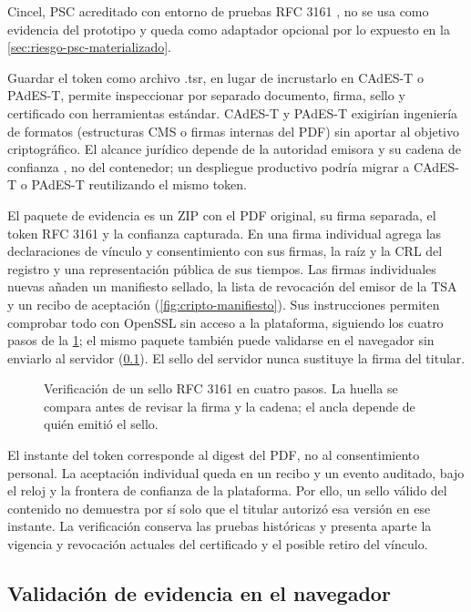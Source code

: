 Cincel, PSC acreditado con entorno de pruebas RFC 3161 \cite{cincel2024}, no se usa como evidencia del prototipo y queda como adaptador opcional por lo expuesto en la \cref{sec:riesgo-psc-materializado}.

Guardar el token como archivo .tsr, en lugar de incrustarlo en CAdES-T o PAdES-T, permite inspeccionar por separado documento, firma, sello y certificado con herramientas estándar. CAdES-T y PAdES-T exigirían ingeniería de formatos (estructuras CMS o firmas internas del PDF) sin aportar al objetivo criptográfico. El alcance jurídico depende de la autoridad emisora y su cadena de confianza \cite{nom151_2016}, no del contenedor; un despliegue productivo podría migrar a CAdES-T o PAdES-T reutilizando el mismo token.

El paquete de evidencia es un ZIP con el PDF original, su firma separada, el token RFC 3161 y la confianza capturada. En una firma individual agrega las declaraciones de vínculo y consentimiento con sus firmas, la raíz y la CRL del registro y una representación pública de sus tiempos. Las firmas individuales nuevas añaden un manifiesto sellado, la lista de revocación del emisor de la TSA y un recibo de aceptación (\cref{fig:cripto-manifiesto}). Sus instrucciones permiten comprobar todo con OpenSSL sin acceso a la plataforma, siguiendo los cuatro pasos de la \cref{fig:cripto-sello}; el mismo paquete también puede validarse en el navegador sin enviarlo al servidor (\cref{sec:validacion-navegador}). El sello del servidor nunca sustituye la firma del titular.

\begin{figure}[!htbp]
  \centering
  
  \caption{Verificación de un sello RFC 3161 en cuatro pasos. La huella se compara antes de revisar la firma y la cadena; el ancla depende de quién emitió el sello.}
  \label{fig:cripto-sello}
\end{figure}

El instante del token corresponde al digest del PDF, no al consentimiento personal. La aceptación individual queda en un recibo y un evento auditado, bajo el reloj y la frontera de confianza de la plataforma. Por ello, un sello válido del contenido no demuestra por sí solo que el titular autorizó esa versión en ese instante. La verificación conserva las pruebas históricas y presenta aparte la vigencia y revocación actuales del certificado y el posible retiro del vínculo.

\subsection{Validación de evidencia en el navegador}\label{sec:validacion-navegador}

